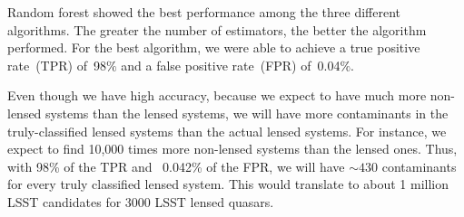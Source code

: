 \documentclass[\docopts]{\docclass}
\begin{document}
Random forest showed the best performance among the three different
algorithms. The greater the number of estimators, the better the
algorithm performed. For the best algorithm, we were able to achieve a
true positive rate~(TPR) of~98$\%$ and a false positive rate~(FPR)
of~0.04$\%$.

Even though we have high accuracy, because we expect to have much more
non-lensed systems than the lensed systems, we will have more
contaminants in the truly-classified lensed systems than the actual
lensed systems. For instance, we expect to find 10,000 times more
non-lensed systems than the lensed ones. Thus, with 98\% of the TPR and
~0.042\% of the FPR, we will have $\sim430$ contaminants for every truly
classified lensed system. This would translate to about 1 million LSST
candidates for 3000 LSST lensed quasars.
\end{document}
